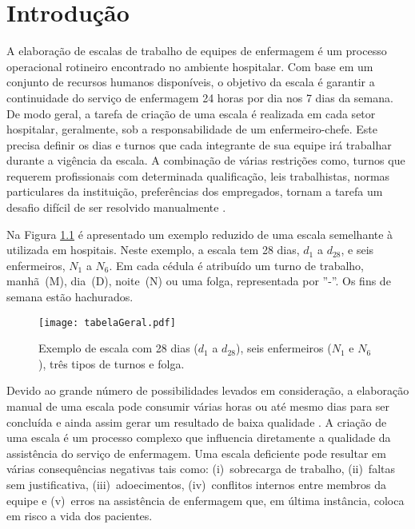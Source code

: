 \documentclass[cic,tc, twoside]{iiufrgs}
\begin{document}
\tableofcontents

\chapter{Introdução}

A elaboração de escalas de trabalho de equipes de enfermagem é um processo operacional rotineiro encontrado no ambiente hospitalar. Com base em um conjunto de recursos humanos disponíveis, o objetivo da escala é garantir a continuidade do serviço de enfermagem 24 horas por dia nos 7 dias da semana. De modo geral, a tarefa de criação de uma escala é realizada em cada setor hospitalar, geralmente, sob a responsabilidade de um enfermeiro-chefe. Este precisa definir os dias e turnos que cada integrante de sua equipe irá trabalhar durante a vigência da escala. A combinação de várias restrições como, turnos que requerem profissionais com determinada qualificação, leis trabalhistas, normas particulares da instituição, preferências dos empregados, tornam a tarefa um desafio difícil de ser resolvido manualmente \cite{rossetti09, souza11}.

Na Figura \ref{fig:escalaExemplo1} é apresentado um exemplo reduzido de uma escala semelhante à utilizada em hospitais.
Neste exemplo, a escala tem 28 dias, $d_1$ a $d_{28}$, e seis enfermeiros, $N_1$ a $N_6$. Em cada cédula é atribuído um turno de trabalho, manhã~(M), dia~(D), noite~(N) ou uma folga, representada por ''-''. Os fins de semana estão hachurados.

\begin{figure}[ht!]
\texttt{[image: tabelaGeral.pdf]}
\centering
\caption{Exemplo de escala com 28 dias ($d_1$ a $d_{28}$), seis enfermeiros ($N_1$ e $N_6$), três tipos de turnos e folga. }
\label{fig:escalaExemplo1}
\end{figure}

Devido ao grande número de possibilidades levados em consideração, a elaboração manual de uma escala pode consumir várias horas ou até mesmo dias para ser concluída e ainda assim gerar um resultado de baixa qualidade \cite{dias03, juliani07}. A criação de uma escala é um processo  complexo que influencia diretamente a qualidade da assistência do serviço de enfermagem. Uma escala deficiente pode resultar em várias  consequências negativas tais como: (i)~sobrecarga de trabalho, (ii)~faltas sem justificativa, (iii)~adoecimentos, (iv)~conflitos internos entre membros da equipe \cite{costa00, keretzky09, souza11} e (v)~erros na assistência de enfermagem que, em última instância, coloca em risco a vida dos pacientes.
\end{document}
